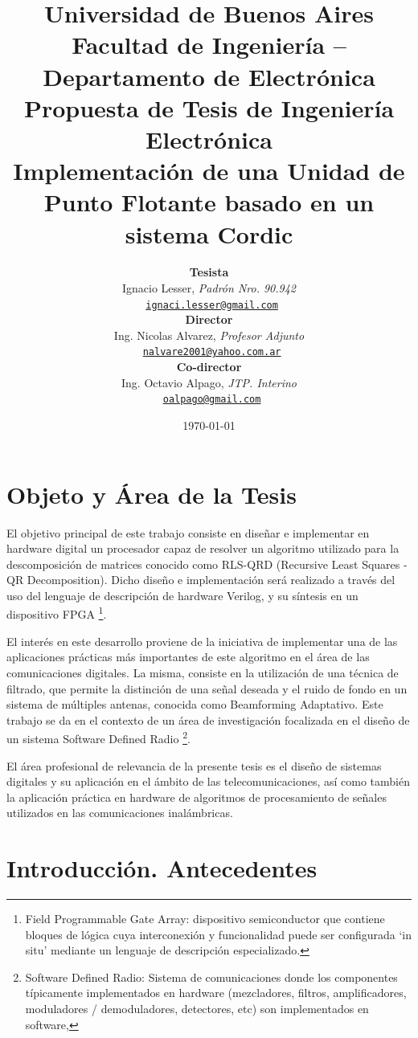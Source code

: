 \documentclass[a4paper]{article}
\title{
   {\normalsize
      Universidad de Buenos Aires\\
      Facultad de Ingeniería -- Departamento de Electrónica\\
      Propuesta de Tesis de Ingeniería Electrónica\\
      \vspace{0.7cm}
   }
   Implementación de una Unidad de Punto Flotante basado en un sistema Cordic
}
\author{ \textbf{Tesista}                                                           \\
         Ignacio Lesser, \textit{Padrón Nro. 90.942}                                \\
         \texttt{ \href{mailto:ignacio.lesser@gmail.com}{ignaci.lesser@gmail.com}}  \\[2.5ex]
         \textbf{Director}                                                          \\
         Ing. Nicolas Alvarez, \textit{Profesor Adjunto}                            \\
         \texttt{ \href{mailto:nalvare2001@yahoo.com.ar}{nalvare2001@yahoo.com.ar}} \\[2.5ex]
         \textbf{Co-director}                                                       \\
         Ing. Octavio Alpago, \textit{JTP. Interino}                                \\
         \texttt{ \href{mailto:oalpago@gmail.com}{oalpago@gmail.com}}               \\[2.5ex]
       }
\date{\today}
\begin{document}
\maketitle



\thispagestyle{fancy}

\section{Objeto y Área de la Tesis}

El objetivo principal de este trabajo consiste en diseñar e implementar en hardware digital un procesador capaz de resolver un algoritmo utilizado para la descomposición de matrices conocido como RLS-QRD (Recursive Least Squares - QR Decomposition). Dicho diseño e implementación será realizado a través del uso del lenguaje de descripción de hardware Verilog, y su síntesis en un dispositivo FPGA \footnote{\label{FPGA}Field Programmable Gate Array: dispositivo semiconductor que contiene bloques de lógica cuya interconexión y funcionalidad puede ser configurada `in situ' mediante un lenguaje de descripción especializado.}.

El interés en este desarrollo proviene de la iniciativa de implementar una de las aplicaciones prácticas más importantes de este algoritmo en el área de las comunicaciones digitales. La misma, consiste en la utilización de una técnica de filtrado, que permite la distinción de una señal deseada y el ruido de fondo en un sistema de múltiples antenas, conocida como Beamforming Adaptativo. Este trabajo se da en el contexto de un área de investigación focalizada en el diseño de un sistema Software Defined Radio \footnote{\label{SDR}Software Defined Radio: Sistema de comunicaciones donde los componentes típicamente implementados en hardware (mezcladores, filtros, amplificadores, moduladores / demoduladores, detectores, etc) son implementados en software,}.

El área profesional de relevancia de la presente tesis es el diseño de sistemas digitales y su aplicación en el ámbito de las telecomunicaciones, así como también la aplicación práctica en hardware de algoritmos de procesamiento de señales utilizados en las comunicaciones inalámbricas.

\newpage

\section{Introducción. Antecedentes}
\end{document}
